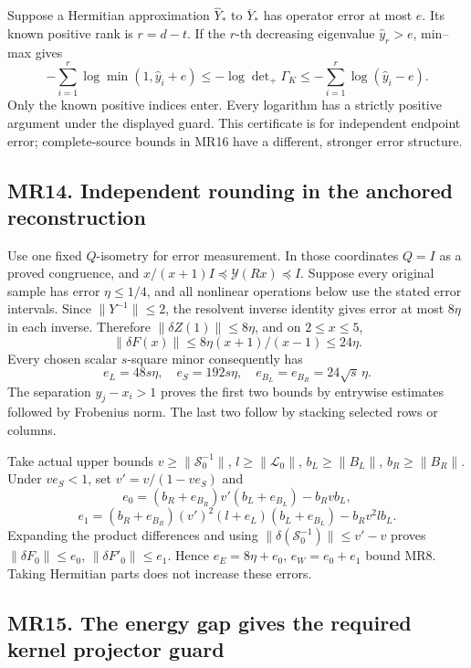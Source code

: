 \documentclass[11pt]{article}
\begin{document}
Suppose a Hermitian approximation \(\widehat Y_*\) to \(\overline Y_*\) has operator error at most \(e\). Its known positive rank is \(r=d-t\). If the \(r\)-th decreasing eigenvalue \(\widehat y_r>e\), min--max gives \[
 -\sum_{i=1}^r\log\min(1,\widehat y_i+e)
 \le-\log\det\nolimits_+\Gamma_K
 \le-\sum_{i=1}^r\log(\widehat y_i-e).
\tag{MR20}
\] Only the known positive indices enter. Every logarithm has a strictly positive argument under the displayed guard. This certificate is for independent endpoint error; complete-source bounds in MR16 have a different, stronger error structure.

\subsection{MR14. Independent rounding in the anchored reconstruction}\label{mr14.-independent-rounding-in-the-anchored-reconstruction}

Use one fixed \(Q\)-isometry for error measurement. In those coordinates \(Q=I\) as a proved congruence, and \(x/(x+1)I\preceq\mathscr Y(Rx)\preceq I\). Suppose every original sample has error \(\eta\le1/4\), and all nonlinear operations below use the stated error intervals. Since \(\|Y^{-1}\|\le2\), the resolvent inverse identity gives error at most \(8\eta\) in each inverse. Therefore \(\|\delta Z(1)\|\le8\eta\), and on \(2\le x\le5\), \[
 \|\delta F(x)\|\le 8\eta(x+1)/(x-1)\le24\eta.
\] Every chosen scalar \(s\)-square minor consequently has \[
 e_L=48s\eta,\quad e_S=192s\eta,\quad
 e_{B_L}=e_{B_R}=24\sqrt s\,\eta.
\tag{MR21}
\] The separation \(y_j-x_i>1\) proves the first two bounds by entrywise estimates followed by Frobenius norm. The last two follow by stacking selected rows or columns.

Take actual upper bounds \(v\ge\|\mathcal S_0^{-1}\|\), \(l\ge\|\mathcal L_0\|\), \(b_L\ge\|B_L\|\), \(b_R\ge\|B_R\|\). Under \(ve_S<1\), set \(v'=v/(1-ve_S)\) and \[
 e_0=(b_R+e_{B_R})v'(b_L+e_{B_L})-b_Rvb_L,
\] \[
 e_1=(b_R+e_{B_R})(v')^2(l+e_L)(b_L+e_{B_L})
       -b_Rv^2lb_L.
\tag{MR22}
\] Expanding the product differences and using \(\|\delta(\mathcal S_0^{-1})\|\le v'-v\) proves \(\|\delta F_0\|\le e_0\), \(\|\delta F'_0\|\le e_1\). Hence \(e_E=8\eta+e_0\), \(e_W=e_0+e_1\) bound MR8. Taking Hermitian parts does not increase these errors.

\subsection{MR15. The energy gap gives the required kernel projector guard}\label{mr15.-the-energy-gap-gives-the-required-kernel-projector-guard}
\end{document}
